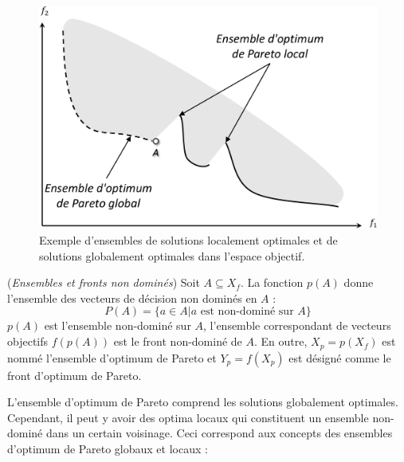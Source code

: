 \begin{figure}
\begin{center}
\includegraphics[scale=0.4]{chapitre2/chap2Fig/pareto-global-local.pdf}
\caption{Exemple d'ensembles de solutions localement optimales et de solutions globalement optimales dans l'espace objectif.}
 \label{fig:pareto-global-local}
\end{center}
\end{figure}

\begin{definition}
 (\textit{Ensembles et fronts non dominés}) Soit $A \subseteq X_f$. La fonction $p(A)$ donne l'ensemble des vecteurs de décision non dominés en $A$ :
 \begin{equation}
  P(A) = \{a \in A | a \text{ est non-dominé sur } A\}
 \end{equation}
 $p(A)$ est l'ensemble non-dominé sur $A$, l'ensemble correspondant de vecteurs objectifs $f(p(A))$ est le front non-dominé de $A$. En outre, $X_p = p(X_f)$ est nommé l'ensemble d'optimum de Pareto et $Y_p = f (X_p)$ est désigné comme le front d'optimum de Pareto.
\end{definition}

L'ensemble d'optimum de Pareto comprend les solutions globalement optimales. Cependant, il peut y avoir des optima locaux qui constituent un ensemble non-dominé dans un certain voisinage. Ceci correspond aux concepts des ensembles d'optimum de Pareto globaux et locaux \cite{Deb01} :

